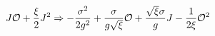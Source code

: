 \begin{equation}
J\mathcal{O}+\frac{\xi }{2}J^{2}\Rightarrow -\frac{\sigma ^{2}}{2 g^{2}}+%
\frac{\sigma }{g\sqrt{\xi}}\mathcal{O}+\frac{\sqrt{\xi}\sigma }{g}J-\frac{1}{%
2\xi }\mathcal{O}^{2}  \label{hsbis}
\end{equation}

